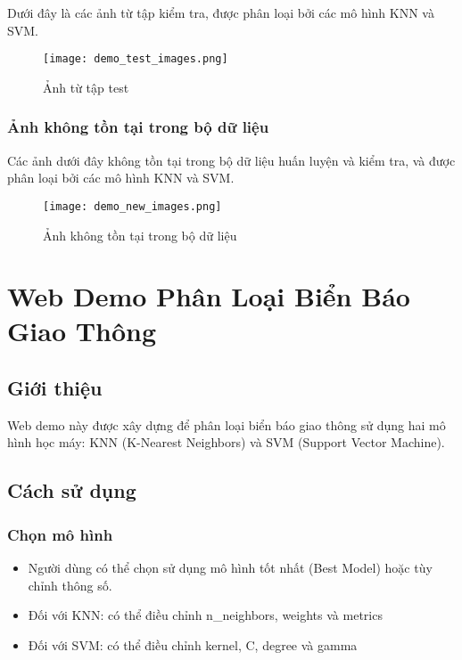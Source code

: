 \documentclass[a4paper,12pt]{article}
\begin{document}
Dưới đây là các ảnh từ tập kiểm tra, được phân loại bởi các mô hình KNN và SVM.

\begin{figure}[H]
    \centering
    \texttt{[image: demo\_test\_images.png]}
    \caption{Ảnh từ tập test}
    \label{fig:test_images}
\end{figure}

\subsubsection{Ảnh không tồn tại trong bộ dữ liệu}

Các ảnh dưới đây không tồn tại trong bộ dữ liệu huấn luyện và kiểm tra, và được phân loại bởi các mô hình KNN và SVM.

\begin{figure}[H]
    \centering
    \texttt{[image: demo\_new\_images.png]}
    \caption{Ảnh không tồn tại trong bộ dữ liệu}
    \label{fig:new_images}
\end{figure}

\newpage
\section*{\centering Web Demo Phân Loại Biển Báo Giao Thông}
\vspace{1cm}
\setcounter{section}{4}
\setcounter{subsection}{0}

\subsection{Giới thiệu}
\hspace{5mm}Web demo này được xây dựng để phân loại biển báo giao thông sử dụng hai mô hình học máy: KNN (K-Nearest Neighbors) và SVM (Support Vector Machine).

\subsection{Cách sử dụng}
\subsubsection{Chọn mô hình}
\begin{itemize}
    \item Người dùng có thể chọn sử dụng mô hình tốt nhất (Best Model) hoặc tùy chỉnh thông số.
    \item Đối với KNN: có thể điều chỉnh n\_neighbors, weights và metrics
    \item Đối với SVM: có thể điều chỉnh kernel, C, degree và gamma
\end{itemize}
\end{document}
